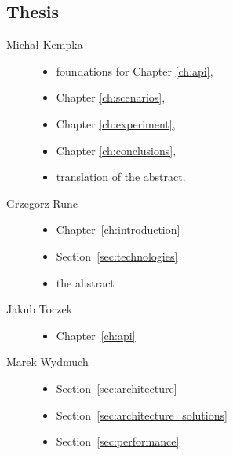 	\subsection{Thesis}
	\begin{description}
		\item[Michał Kempka] \hfill
			\begin{itemize}
				\item foundations for Chapter \ref{ch:api},
				\item Chapter \ref{ch:scenarios},
				\item Chapter \ref{ch:experiment},
				\item Chapter \ref{ch:conclusions},
				\item translation of the abstract.
			\end{itemize}
		\item[Grzegorz Runc] \hfill
			\begin{itemize}
				\item Chapter~\ref{ch:introduction}
				\item Section~\ref{sec:technologies}
                \item the abstract
			\end{itemize}
		\item[Jakub Toczek] \hfill
			\begin{itemize}
				\item Chapter~\ref{ch:api}
			\end{itemize}
		\item[Marek Wydmuch] \hfill
			\begin{itemize}
				\item Section~\ref{sec:architecture}
				\item Section~\ref{sec:architecture_solutions}
				\item Section~\ref{sec:performance}
			\end{itemize}
	\end{description}
